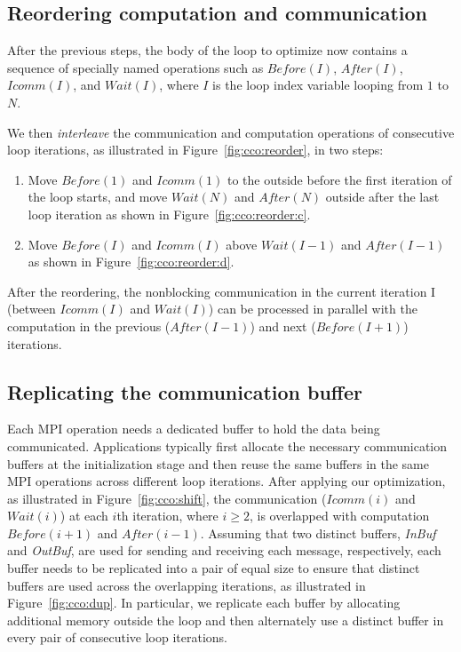 \subsection{Reordering computation and communication}

After the previous steps, the body of the loop to optimize now
contains a sequence of specially named operations such as $Before(I)$,
$After(I)$, $Icomm(I)$, and $Wait(I)$, where $I$ is the loop index
variable looping from $1$ to $N$.

We then \emph{interleave} the communication and computation operations
of consecutive loop iterations, as illustrated in
Figure~\ref{fig:cco:reorder}, in two steps:

\begin{enumerate}

\item Move $Before(1)$ and $Icomm(1)$ to the outside before the first
  iteration of the loop starts, and move $Wait(N)$ and $After(N)$
  outside after the last loop iteration as shown in
  Figure~\ref{fig:cco:reorder:c}.

\item Move $Before(I)$ and $Icomm(I)$ above $Wait(I-1)$ and
  $After(I-1)$ as shown in Figure~\ref{fig:cco:reorder:d}.

\end{enumerate}

After the reordering, the nonblocking communication in the current
iteration I (between $Icomm(I)$ and $Wait(I)$) can be processed in
parallel with the computation in the previous ($After(I-1)$) and next
($Before(I+1)$) iterations.


\subsection{Replicating the communication buffer}

Each MPI operation needs a dedicated buffer to hold the data being
communicated.  Applications typically first allocate the necessary
communication buffers at the initialization stage and then reuse the
same buffers in the same MPI operations across different loop
iterations.  After applying our optimization, as illustrated in
Figure~\ref{fig:cco:shift}, the communication ($Icomm(i)$ and
$Wait(i)$) at each $i$th iteration, where $i \geq 2$, is overlapped
with computation $Before(i+1)$ and $After(i-1)$.  Assuming that two
distinct buffers, {\em InBuf} and {\em OutBuf}, are used for sending
and receiving each message, respectively, each buffer needs to be
replicated into a pair of equal size to ensure that distinct buffers
are used across the overlapping iterations, as illustrated in
Figure~\ref{fig:cco:dup}.  In particular, we replicate each buffer by
allocating additional memory outside the loop and then alternately use
a distinct buffer in every pair of consecutive loop iterations.


